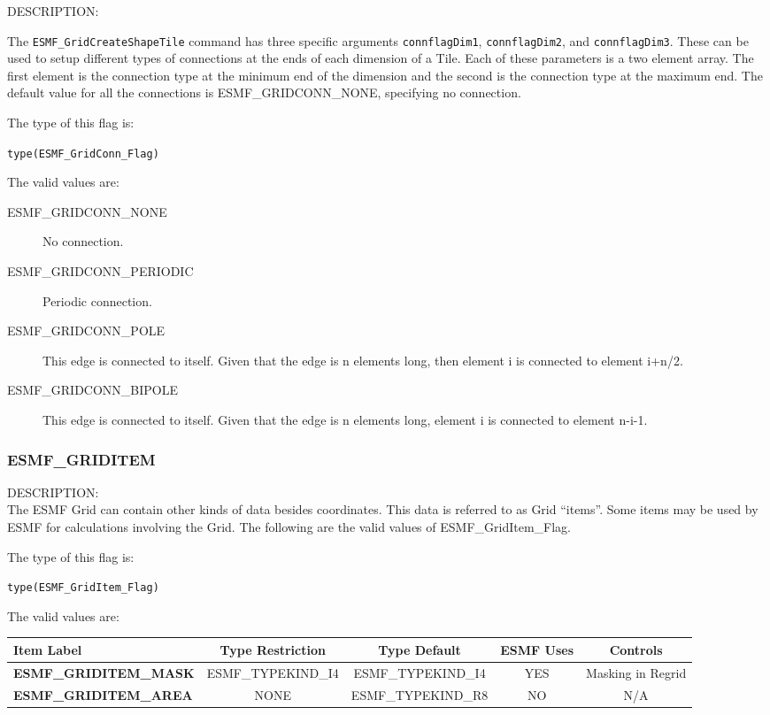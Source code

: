 {\sf DESCRIPTION:\\}
\begin{sloppypar}
The {\tt ESMF\_GridCreateShapeTile} command has three specific arguments
{\tt connflagDim1}, {\tt connflagDim2}, and {\tt connflagDim3}. These can be used
to setup different types of connections at the ends of each dimension
of a Tile.  Each of these parameters is a two element array. The first
element is the connection type at the minimum end of the dimension
and the second is the connection type at the maximum end. The default
value for all the connections is ESMF\_GRIDCONN\_NONE, specifying no
connection.
\end{sloppypar}

The type of this flag is:

{\tt type(ESMF\_GridConn\_Flag)}

The valid values are:
\begin{description}
\item [ESMF\_GRIDCONN\_NONE] No connection.

\item [ESMF\_GRIDCONN\_PERIODIC] Periodic connection.

\item [ESMF\_GRIDCONN\_POLE] This edge is connected to itself. Given
that the edge is n elements long, then element i is connected to
element i+n/2.

\item [ESMF\_GRIDCONN\_BIPOLE] This edge is connected to itself. Given
that the edge is n elements long, element i is connected to element n-i-1.
\end{description}


\subsubsection{ESMF\_GRIDITEM}
\label{const:griditem}

{\sf DESCRIPTION:\\}
The ESMF Grid can contain other kinds of data besides coordinates. 
This data is referred to as Grid ``items''. Some items may be used
by ESMF for calculations involving the Grid. The following
are the valid values of ESMF\_GridItem\_Flag.

The type of this flag is:

{\tt type(ESMF\_GridItem\_Flag)}

The valid values are:
\newline
\begin{tabular}{|l|c|c|c|c||}
\hline
\hline
Item Label & {\bf Type Restriction}  & {\bf Type Default} & {\bf ESMF Uses} & {\bf Controls} \\
\hline
{\bf ESMF\_GRIDITEM\_MASK}  & ESMF\_TYPEKIND\_I4 & ESMF\_TYPEKIND\_I4 & YES & Masking in Regrid \\
{\bf ESMF\_GRIDITEM\_AREA} & NONE & ESMF\_TYPEKIND\_R8 & NO & N/A \\
\hline
\hline
\end{tabular}


